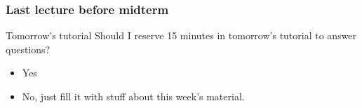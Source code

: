 

\begin{frame}
	\frametitle{Last lecture before midterm}
	
	\begin{questionblock}{Tomorrow's tutorial}
		Should I reserve 15 minutes in tomorrow's tutorial to answer questions?
		\begin{itemize}
			\item Yes
			\item No, just fill it with stuff about this week's material.
		\end{itemize}
	\end{questionblock}
\end{frame}
